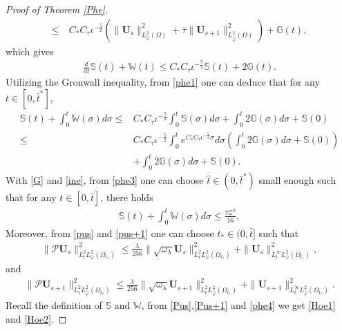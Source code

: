 \documentclass[10pt,a4paper]{amsart}
\begin{document}
\begin{proof}[Proof of Theorem \ref{Phe}]
\begin{align}
\leq&~C_{*}C_{\tau}\iota^{-\frac{5}{2}}
      \left(\|\mathbf{U}_{s}\|_{L_{\varphi}^{2}(\Omega)}^{2}+\bar{\tau}\|\mathbf{U}_{s+1}\|_{L_{\hat{\varphi}}^{2}(\Omega)}^{2}\right)
    +\mathbb{G}(t),\nonumber
\end{align}
which gives
\begin{align}\label{phe1}
\frac{d}{dt}\mathbb{S}(t)+\mathbb{W}(t)
\leq C_{*}C_{\tau}\iota^{-\frac{5}{2}}\mathbb{S}(t)+2\mathbb{G}(t).
\end{align}
Utilizing the Gronwall inequality, from \eqref{phe1} one can deduce that for any $t\in[0,\bar{t}^{*}]$,
\begin{align}\label{phe3}
\mathbb{S}(t)+\int_{0}^{t}\mathbb{W}(\sigma)d\sigma
\leq& C_{*}C_{\tau}\iota^{-\frac{5}{2}}\int_{0}^{t}\mathbb{S}(\sigma)d\sigma
     +\int_{0}^{t}2\mathbb{G}(\sigma)d\sigma
     +\mathbb{S}(0)\\
\leq& C_{*}C_{\tau}\iota^{-\frac{5}{2}}\int_{0}^{t}e^{C_{*}C_{\tau}\iota^{-\frac{5}{2}}\sigma}d\sigma
           \left(\int_{0}^{t}2\mathbb{G}(\sigma)d\sigma+\mathbb{S}(0)\right)\nonumber\\
    &+\int_{0}^{t}2\mathbb{G}(\sigma)d\sigma
     +\mathbb{S}(0).\nonumber
\end{align}
With \eqref{G} and \eqref{ine}, from \eqref{phe3} one can choose $\hat{t}\in (0,\bar{t}^{*})$ small enough such that for any $t\in[0,\hat{t}]$, there holds
\begin{align}\label{phe4}
\mathbb{S}(t)+\int_{0}^{t}\mathbb{W}(\sigma)d\sigma\leq \frac{\bar{\tau}\mathcal{Z}^{2}}{16},
\end{align}
Moreover, from \eqref{pus} and \eqref{pus+1} one can choose $t_{*}\in(0,\hat{t}]$ such that
\begin{align}\label{Pus}
\|\mathcal{P}\mathbf{U}_{s}\|_{L_{t}^{2}L_{\varphi}^{2}(\Omega_{t_{*}})}^{2}
\leq \frac{\lambda}{256}\|\sqrt{\omega_{\lambda}}\mathbf{U}_{s}\|_{L_{t}^{2}L_{\varphi}^{2}(\Omega_{t_{*}})}^{2}
    +\|\mathbf{U}_{s}\|_{L_{t}^{\infty}L_{\varphi}^{2}(\Omega_{t_{*}})}^{2},
\end{align}
and
\begin{align}\label{Pus+1}
\|\mathcal{P}\mathbf{U}_{s+1}\|_{L_{t}^{2}L_{\hat{\varphi}}^{2}(\Omega_{t_{*}})}^{2}
\leq \frac{\lambda}{256}\|\sqrt{\omega_{\lambda}}\mathbf{U}_{s+1}\|_{L_{t}^{2}L_{\hat{\varphi}}^{2}(\Omega_{t_{*}})}^{2}
    +\|\mathbf{U}_{s+1}\|_{L_{t}^{\infty}L_{\hat{\varphi}}^{2}(\Omega_{t_{*}})}^{2}.
\end{align}
Recall the definition of $\mathbb{S}$ and $\mathbb{W}$, from \eqref{Pus},\eqref{Pus+1} and \eqref{phe4} we get \eqref{Hoe1} and \eqref{Hoe2}.
\end{proof}
\end{document}
